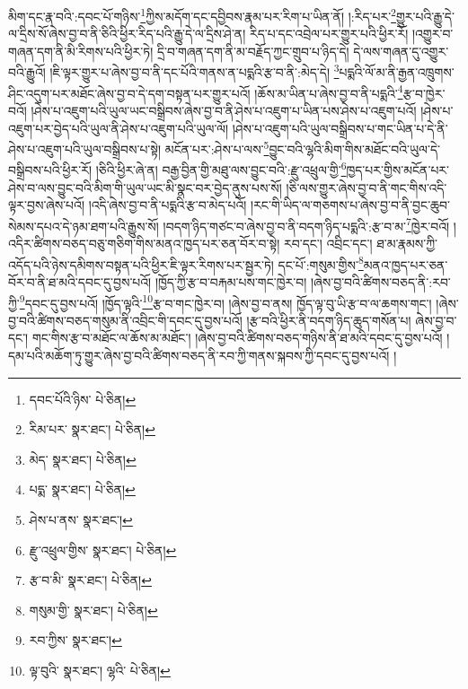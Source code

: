 མིག་དང་རྣ་བའི་:དབང་པོ་གཉིས་\footnote{དབང་པོའི་ཉིས་  པེ་ཅིན། }ཀྱིས་མདོག་དང་དབྱིབས་རྣམ་པར་རིག་པ་ཡིན་ནོ། །:རིད་པར་\footnote{རིམ་པར་  སྣར་ཐང་།  པེ་ཅིན། }གྱུར་པའི་རྒྱུ་དེ་ལ་དྲིས་སོ་ཞེས་བྱ་བ་ནི་ཅིའི་ཕྱིར་རིད་པའི་རྒྱུ་དེ་ལ་དྲིས་ཤེ་ན། རིད་པ་དང་འབྲེལ་པར་གྱུར་པའི་ཕྱིར་རོ། །འགྱུར་བ་གཞན་དག་ནི་མི་རིགས་པའི་ཕྱིར་ཏེ། དྲི་བ་གཞན་དག་ནི་མ་བརྗོད་ཀྱང་གྲུབ་པ་ཉིད་དེ། དེ་ལས་གཞན་དུ་འགྱུར་བའི་རྒྱུའོ། །ཇི་ལྟར་གྱུར་པ་ཞེས་བྱ་བ་ནི་དང་པོའི་གནས་ན་པདྨའི་རྩ་བ་ནི་:མེད་དེ། \footnote{མེད་  སྣར་ཐང་།  པེ་ཅིན། }པདྨའི་ལོ་མ་ནི་རྒྱན་འཁྲུགས་ཤིང་འདུག་པར་མཐོང་ཞེས་བྱ་བ་དེ་དག་བསྟན་པར་གྱུར་པའོ། །ཆོས་མ་ཡིན་པ་ཞེས་བྱ་བ་ནི་པདྨའི་\footnote{པདྨ་  སྣར་ཐང་།  པེ་ཅིན། }རྩ་བ་ཁྱེར་བའོ། །ཤེས་པ་འཇུག་པའི་ཡུལ་ཡང་བསྒྲིབས་ཞེས་བྱ་བ་ནི་ཤེས་པ་འཇུག་པ་ཡིན་པས་ཤེས་པ་འཇུག་པའོ། །ཤེས་པ་འཇུག་པར་བྱེད་པའི་ཡུལ་ནི་ཤེས་པ་འཇུག་པའི་ཡུལ་ལོ། །ཤེས་པ་འཇུག་པའི་ཡུལ་བསྒྲིབས་པ་གང་ཡིན་པ་དེ་ནི་ཤེས་པ་འཇུག་པའི་ཡུལ་བསྒྲིབས་པ་སྟེ། མངོན་པར་:ཤེས་པ་ལས་\footnote{ཤེས་པ་ནས་  སྣར་ཐང་། }བྱུང་བའི་ལྷའི་མིག་གིས་མཐོང་བའི་ཡུལ་དེ་བསྒྲིབས་པའི་ཕྱིར་རོ། །ཅིའི་ཕྱིར་ཞེ་ན། བརྒྱ་བྱིན་གྱི་མཐུ་ལས་བྱུང་བའི་:རྫུ་འཕྲུལ་གྱི་\footnote{རྫུ་འཕྲུལ་གྱིས་  སྣར་ཐང་།  པེ་ཅིན། }ཁྱད་པར་གྱིས་མངོན་པར་ཤེས་བ་ལས་བྱུང་བའི་མིག་གི་ཡུལ་ཡང་མི་སྣང་བར་བྱེད་ནུས་པས་སོ། །ཅི་ལས་གྱུར་ཞེས་བྱ་བ་ནི་གང་གིས་འདི་ལྟར་བྱས་ཞེས་པའོ། །འདི་ཞེས་བྱ་བ་ནི་པདྨའི་རྩ་བ་མེད་པའོ། །རང་གི་ཡིད་ལ་གཅགས་པ་ཞེས་བྱ་བ་ནི་བྱང་ཆུབ་སེམས་དཔའ་དེ་ཉམ་ཐག་པའི་རྒྱུས་སོ། །བདག་ཉིད་གཙང་བ་ཞེས་བྱ་བ་ནི་བདག་ཉིད་པདྨའི་:རྩ་བ་མ་\footnote{རྩ་བ་མི་  སྣར་ཐང་།  པེ་ཅིན། }ཁྱེར་བའོ། །འདིར་ཚིགས་བཅད་བཅུ་གཅིག་གིས་མནའ་ཁྱད་པར་ཅན་བོར་བ་སྟེ། རབ་དང་། འབྲིང་དང་། ཐ་མ་རྣམས་ཀྱི་འདོད་པའི་ཉེས་དམིགས་བསྟན་པའི་ཕྱིར་ཇི་ལྟར་རིགས་པར་སྦྱར་ཏེ། དང་པོ་:གསུམ་གྱིས་\footnote{གསུམ་གྱི་  སྣར་ཐང་།  པེ་ཅིན། }མནའ་ཁྱད་པར་ཅན་བོར་བ་ནི་ཐ་མའི་དབང་དུ་བྱས་པའོ། །ཁྱོད་ཀྱི་རྩ་བ་བརྐམ་པས་གང་ཁྱེར་བ། །ཞེས་བྱ་བའི་ཚིགས་བཅད་ནི་:རབ་ཀྱི་\footnote{རབ་ཀྱིས་  སྣར་ཐང་། }དབང་དུ་བྱས་པའོ། །ཁྱོད་ལྟའི་\footnote{ལྟ་བུའི་  སྣར་ཐང་། ལྷའི་  པེ་ཅིན། }རྩ་བ་གང་ཁྱེར་བ། །ཞེས་བྱ་བ་ནས། ཁྱོད་ལྟ་བུ་ཡི་རྩ་བ་ལ་ཆགས་གང་། །ཞེས་བྱ་བའི་ཚིགས་བཅད་གསུམ་ནི་འབྲིང་གི་དབང་དུ་བྱས་པའོ། །རྩ་བའི་ཕྱིར་ནི་བདག་ཉིད་ཆུད་གསོན་པ། ཞེས་བྱ་བ་དང་། གང་གིས་རྩ་བ་མཐོང་ལ་ཆོས་མ་མཐོང་། །ཞེས་བྱ་བའི་ཚིགས་བཅད་གཉིས་ནི་ཐ་མའི་དབང་དུ་བྱས་པའོ། །དམ་པའི་མཆོག་ཏུ་གྱུར་ཞེས་བྱ་བའི་ཚིགས་བཅད་ནི་རབ་ཀྱི་གནས་སྐབས་ཀྱི་དབང་དུ་བྱས་པའོ། །
